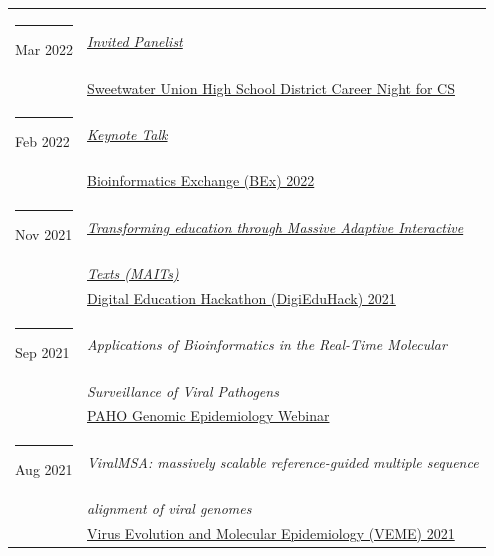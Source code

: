 \documentclass[margin,line]{res}
\begin{document}
\begin{resume}
\begin{longtable}{@{}p{0.7in}p{4in}}
\hspace*{-4mm} \rule{-1mm}{5mm} Mar 2022 & \href{http://www.sweetwaterschools.org/}{\textit{Invited Panelist}}\\*
\hspace*{-4mm} & \hspace{4mm} \href{http://www.sweetwaterschools.org/}{Sweetwater Union High School District Career Night for CS}\\
\hspace*{-4mm} \rule{-1mm}{5mm} Feb 2022 & \href{https://bioinformatics.ucsd.edu/node/138}{\textit{Keynote Talk}}\\*
\hspace*{-4mm} & \hspace{4mm} \href{https://bioinformatics.ucsd.edu/node/138}{Bioinformatics Exchange (BEx) 2022}\\
\hspace*{-4mm} \rule{-1mm}{5mm} Nov 2021 & \href{https://www.youtube.com/watch?v=EPU_nv-yb_w&t=8206s}{\textit{Transforming education through Massive Adaptive Interactive}}\\*
\hspace*{-4mm} & \hspace{4mm} \href{https://www.youtube.com/watch?v=EPU_nv-yb_w&t=8206s}{\textit{Texts (MAITs)}}\\*
\hspace*{-4mm} & \hspace{4mm} \href{https://digieduhack.com/}{Digital Education Hackathon (DigiEduHack) 2021}\\
\hspace*{-4mm} \rule{-1mm}{5mm} Sep 2021 & \textit{Applications of Bioinformatics in the Real-Time Molecular}\\*
\hspace*{-4mm} & \hspace{4mm} \textit{Surveillance of Viral Pathogens}\\*
\hspace*{-4mm} & \hspace{4mm} \href{https://www.paho.org/}{PAHO Genomic Epidemiology Webinar}\\
\hspace*{-4mm} \rule{-1mm}{5mm} Aug 2021 & \textit{ViralMSA: massively scalable reference-guided multiple sequence}\\*
\hspace*{-4mm} & \hspace{4mm} \textit{alignment of viral genomes}\\*
\hspace*{-4mm} & \hspace{4mm} \href{https://rega.kuleuven.be/cev/veme-workshop/2021}{Virus Evolution and Molecular Epidemiology (VEME) 2021}\\

\end{longtable}
\end{resume}
\end{document}
